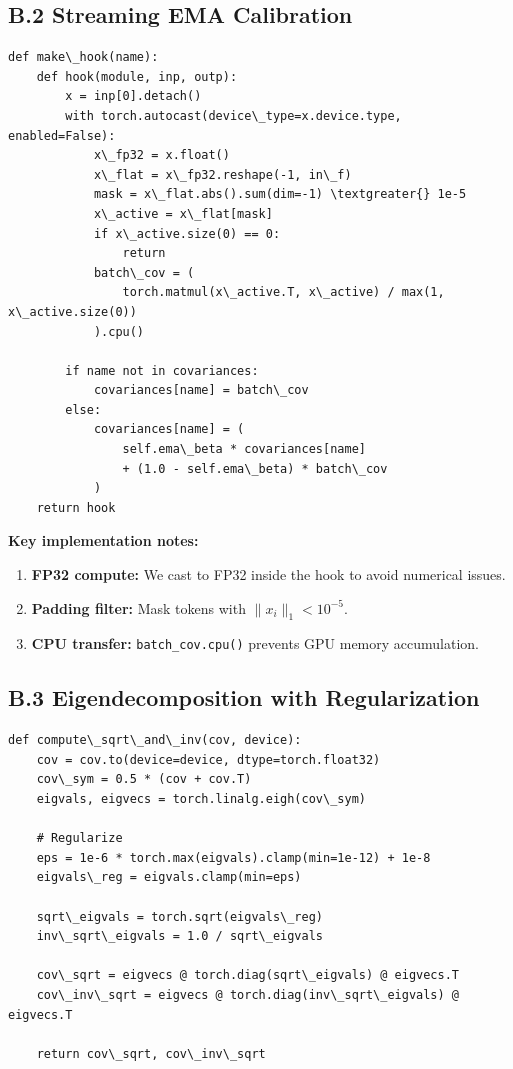 \subsection{B.2 Streaming EMA Calibration}

\begin{lstlisting}
def make\_hook(name):
    def hook(module, inp, outp):
        x = inp[0].detach()
        with torch.autocast(device\_type=x.device.type, enabled=False):
            x\_fp32 = x.float()
            x\_flat = x\_fp32.reshape(-1, in\_f)
            mask = x\_flat.abs().sum(dim=-1) \textgreater{} 1e-5
            x\_active = x\_flat[mask]
            if x\_active.size(0) == 0:
                return
            batch\_cov = (
                torch.matmul(x\_active.T, x\_active) / max(1, x\_active.size(0))
            ).cpu()
        
        if name not in covariances:
            covariances[name] = batch\_cov
        else:
            covariances[name] = (
                self.ema\_beta * covariances[name]
                + (1.0 - self.ema\_beta) * batch\_cov
            )
    return hook
\end{lstlisting}

\textbf{Key implementation notes:}

\begin{enumerate}
\item \textbf{FP32 compute:} We cast to FP32 inside the hook to avoid numerical issues.
\item \textbf{Padding filter:} Mask tokens with $\|x_i\|_1 < 10^{-5}$.
\item \textbf{CPU transfer:} \texttt{batch\_cov.cpu()} prevents GPU memory accumulation.

\end{enumerate}
\subsection{B.3 Eigendecomposition with Regularization}

\begin{lstlisting}
def compute\_sqrt\_and\_inv(cov, device):
    cov = cov.to(device=device, dtype=torch.float32)
    cov\_sym = 0.5 * (cov + cov.T)
    eigvals, eigvecs = torch.linalg.eigh(cov\_sym)
    
    # Regularize
    eps = 1e-6 * torch.max(eigvals).clamp(min=1e-12) + 1e-8
    eigvals\_reg = eigvals.clamp(min=eps)
    
    sqrt\_eigvals = torch.sqrt(eigvals\_reg)
    inv\_sqrt\_eigvals = 1.0 / sqrt\_eigvals
    
    cov\_sqrt = eigvecs @ torch.diag(sqrt\_eigvals) @ eigvecs.T
    cov\_inv\_sqrt = eigvecs @ torch.diag(inv\_sqrt\_eigvals) @ eigvecs.T
    
    return cov\_sqrt, cov\_inv\_sqrt
\end{lstlisting}

